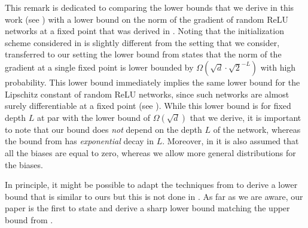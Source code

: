 \begin{remark}\label{remark:compare_lower}
This remark is dedicated to comparing the lower bounds that we derive in this work (see )
with a lower bound on the norm of the gradient of random ReLU networks at a fixed point that was derived in \cite[Lemma~2.2]{bartlett2021adversarial}.
Noting that the initialization scheme considered in \cite{bartlett2021adversarial} is slightly different from the setting that we consider,
transferred to our setting the lower bound from \cite{bartlett2021adversarial} states that the norm of the gradient at a single fixed point is lower bounded by $\Omega\left(\sqrt{d} \cdot \sqrt{2}^{-L}\right)$ with high probability. 
This lower bound immediately implies the same lower bound for the Lipschitz constant of random ReLU
networks, since such networks are almost surely differentiable at a fixed point (see ). While this lower bound is for fixed depth $L$ at par 
with the lower bound of $\Omega(\sqrt{d})$ that we derive, it is important to note that our bound does \emph{not} depend on the depth $L$ of the network,
whereas the bound from \cite{bartlett2021adversarial} has \emph{exponential} decay in $L$. 
Moreover, in \cite{bartlett2021adversarial} it is also assumed that all the biases are equal to zero, whereas we allow more general distributions for the biases.

In principle, it might be possible to adapt the techniques from \cite{bartlett2021adversarial} to derive a lower bound
that is similar to ours but this is not done in \cite{bartlett2021adversarial}. 
As far as we are aware, our paper is the first to state and derive a sharp lower bound matching the upper bound from \cite{buchanan2021deep}.
\end{remark}

